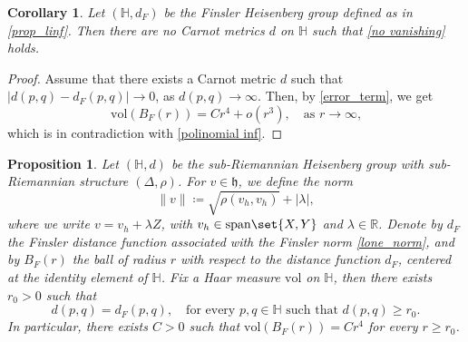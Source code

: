 \documentclass[a4paper,11pt,reqno]{amsart}
\theoremstyle{plain}
\newtheorem{corollary}[theorem]{Corollary}
\newtheorem{proposition}[theorem]{Proposition}
\theoremstyle{definition}
\newcommand{\R}{\mathbb R}
\renewcommand{\H}{\mathbb H}
\newcommand{\spn}{\mathrm{span}}
\newcommand{\vol}{\mathrm{vol}}
\newcommand{\coloneq}{\coloneqq}
\begin{document}
\begin{corollary} \label{no bounded carnot}
 Let $(\H,d_F)$ be the Finsler Heisenberg group defined as in \cref{prop_linf}. Then there are no Carnot metrics $d$ on $\H$ such that \eqref{no vanishing} holds.
\end{corollary} 
\begin{proof}
 Assume that there exists a Carnot metric $d$ such that $\lvert d(p,q) - d_F(p,q) \rvert \to 0$, as $d(p,q) \to \infty$.
 Then, by \cref{error_term},
 we get
 \begin{equation*}
 \vol(B_F(r)) = C r^4 + o(r^3), \quad \text{as $r\to \infty$,}
 \end{equation*}
 which is in contradiction with \eqref{polinomial inf}.
\end{proof} 


\begin{proposition} \label{prop_ellone}
 Let $(\H,d)$ be the sub-Riemannian Heisenberg group with sub-Riemannian structure $(\Delta,\rho)$. For $v \in \mathfrak{h}$, we define the norm
 \begin{equation} \label{lone_norm}
 \lVert v \rVert \coloneq \sqrt{\rho(v_h,v_h)}+ \lvert \lambda \rvert, 
 \end{equation}
 where we write $v = v_h + \lambda Z$, with $v_h \in \spn \set{X,Y}$ and $\lambda\in\R$. Denote by $d_F$ the Finsler distance function associated with the Finsler norm \eqref{lone_norm}, and by $B_F(r)$ the ball of radius $r$ with respect to the distance function $d_F$, centered at the identity element of $\H$. Fix a Haar measure $\vol$ on $\H$, then there exists $r_0 > 0$ such that
 \begin{equation*}
 d(p,q) = d_F(p,q), \quad \text{for every $p,q \in \H$ such that $d(p,q)\ge r_0$.}
 \end{equation*}
 In particular, there exists $C>0$ such that $\vol(B_F(r))=Cr^4$ for every $r \ge r_0$.
\end{proposition}
\end{document}
